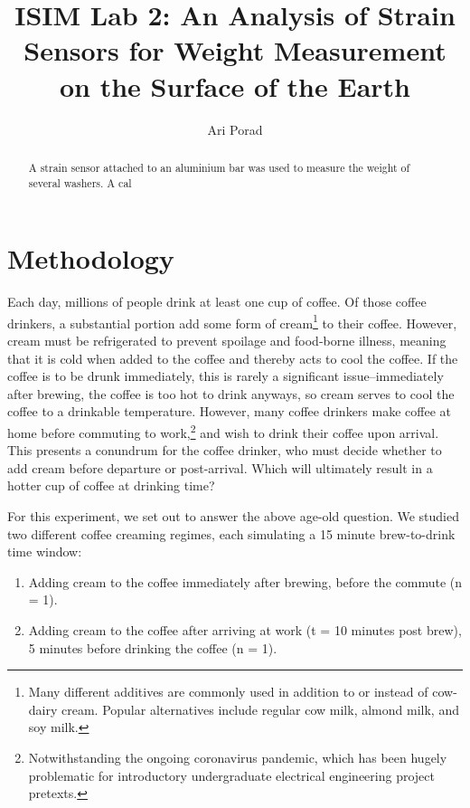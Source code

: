 \documentclass[11pt]{article}
\begin{document}
\title{ISIM Lab 2: An Analysis of Strain Sensors for Weight Measurement on the Surface of the Earth}
\author{Ari Porad}
\maketitle %

\begin{abstract}
    A strain sensor attached to an aluminium bar was used to measure the weight of several washers. A cal
\end{abstract}

\section{Methodology}

Each day, millions of people drink at least one cup of coffee. Of those coffee drinkers, a substantial portion add some form of cream\footnote{Many different additives are commonly used in addition to or instead of cow-dairy cream. Popular alternatives include regular cow milk, almond milk, and soy milk.} to their coffee. However, cream must be refrigerated to prevent spoilage and food-borne illness, meaning that it is cold when added to the coffee and thereby acts to cool the coffee. If the coffee is to be drunk immediately, this is rarely a significant issue--immediately after brewing, the coffee is too hot to drink anyways, so cream serves to cool the coffee to a drinkable temperature. However, many coffee drinkers make coffee at home before commuting to work,\footnote{Notwithstanding the ongoing coronavirus pandemic, which has been hugely problematic for introductory undergraduate electrical engineering project pretexts.} and wish to drink their coffee upon arrival. This presents a conundrum for the coffee drinker, who must decide whether to add cream before departure or post-arrival. Which will ultimately result in a hotter cup of coffee at drinking time?

For this experiment, we set out to answer the above age-old question. We studied two different coffee creaming regimes, each simulating a 15 minute brew-to-drink time window:

\begin{enumerate}
    \item Adding cream to the coffee immediately after brewing, before the commute (n = 1).
	\item Adding cream to the coffee after arriving at work (t = 10 minutes post brew), 5 minutes before drinking the coffee (n = 1).
\end{enumerate}
\end{document}
